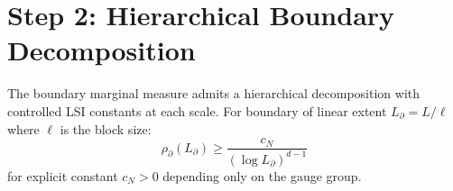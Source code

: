 \section{Step 2: Hierarchical Boundary Decomposition}

\begin{theorem}
\label{thm:multiscale_boundary_lsi}
The boundary marginal measure admits a hierarchical decomposition with controlled LSI constants at each scale. For boundary of linear extent $L_{\partial} = L/\ell$ where $\ell$ is the block size:
\begin{equation}
\rho_{\partial}(L_{\partial}) \geq \frac{c_N}{(\log L_{\partial})^{d-1}}
\end{equation}
for explicit constant $c_N > 0$ depending only on the gauge group.
\end{theorem}

